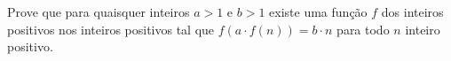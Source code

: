 Prove que para quaisquer inteiros $a > 1$ e $b > 1$ existe uma função $f$ dos inteiros positivos nos inteiros positivos tal que
$f(a\cdot f(n)) = b\cdot n$
para todo $n$ inteiro positivo.